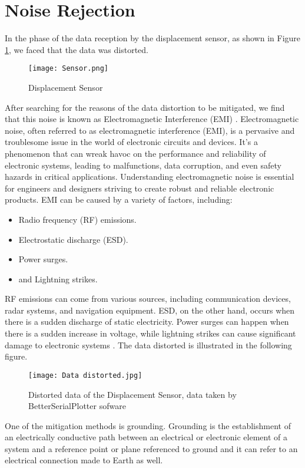 \section{Noise Rejection}
In the phase of the data reception by the displacement sensor, as shown in Figure \ref{fig:Displacement Sensor}, we faced that the data was distorted.
\begin{figure}[H]
    \centering
    \texttt{[image: Sensor.png]}
    \caption{Displacement Sensor}
    \label{fig:Displacement Sensor}
    
\end{figure}
After searching for the reasons of the data distortion to be mitigated, we find that this noise is known as Electromagnetic Interference (EMI) \cite{digimaxEMI}.
Electromagnetic noise, often referred to as electromagnetic interference (EMI), is a pervasive and troublesome issue in the world of electronic circuits and devices. It's a phenomenon that can wreak havoc on the performance and reliability of electronic systems, leading to malfunctions, data corruption, and even safety hazards in critical applications. Understanding electromagnetic noise is essential for engineers and designers striving to create robust and reliable electronic products\cite{fastercapitalEMNoise}.
EMI can be caused by a variety of factors, including:
\begin{itemize}
    \item Radio frequency (RF) emissions.
    \item Electrostatic discharge (ESD).
    \item Power surges.
    \item and Lightning strikes.
\end{itemize}
   RF emissions can come from various sources, including communication devices, radar systems, and navigation equipment. ESD, on the other hand, occurs when there is a sudden discharge of static electricity. Power surges can happen when there is a sudden increase in voltage, while lightning strikes can cause significant damage to electronic systems\cite{digimaxEMI} \cite{fastercapitalEMNoise}.
\newline
The data distorted is illustrated in the following figure.
\begin{figure}[H]
    \centering
    \texttt{[image: Data distorted.jpg]}
    \caption{Distorted data of the Displacement Sensor, data taken by BetterSerialPlotter sofware}
    \label{fig:Distorted data}
    
\end{figure}
One of the mitigation methods is grounding.
\newline
Grounding is the establishment of an electrically conductive path between an electrical or electronic element of a system and a reference point or plane referenced to ground and it can refer to an electrical connection made to Earth as well. 

